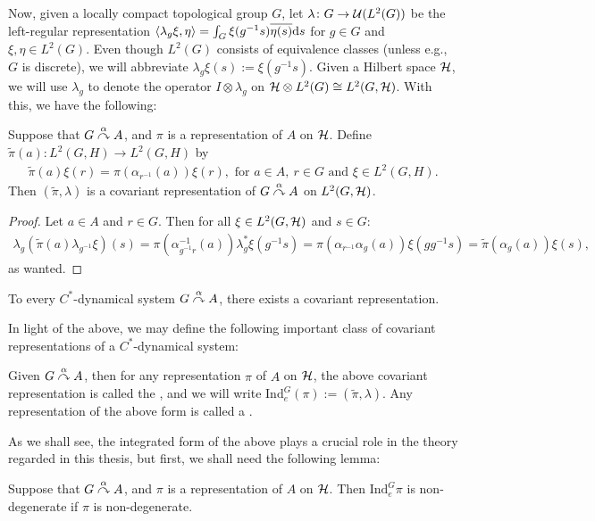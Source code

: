Now, given a locally compact topological group $G$, let $\lambda \colon G \to \mathcal{U}(L^2(G))$ be the left-regular representation $\langle \lambda_g \xi, \eta\rangle = \int_G \xi(g^{-1}s)\overline{\eta(s)}\mathrm{d} s$ for $g \in G$ and $\xi, \eta \in L^2(G)$. Even though $L^2(G)$ consists of equivalence classes (unless e.g., $G$ is discrete), we will abbreviate $\lambda_g \xi(s) := \xi(g^{-1}s)$. Given a Hilbert space $\mathcal{H}$, we will use $\lambda_g$ to denote the operator $I \otimes \lambda_g$ on $\mathcal{H} \otimes L^2(G) \cong L^2(G,\mathcal{H})$. With this, we have the following:
\begin{lemma}
	Suppose that $G \stackrel{\alpha}{\curvearrowright} A$, and $\pi$ is a representation of $A$ on $\mathcal{H}$. Define $\tilde{\pi}(a) \colon L^2(G,H) \to L^2(G,H)$ by 
	\begin{align*}
		\tilde{\pi}(a)\xi(r) = \pi(\alpha_{r^{-1}}(a))\xi(r), \text{ for } a \in A, \ r \in G \text{ and } \xi \in L^2(G,H).
	\end{align*}
	Then $(\tilde{\pi},\lambda)$ is a covariant representation of $G \stackrel{\alpha}{\curvearrowright} A$ on $L^2(G,\mathcal{H})$.
	\label{cross:regularrep}
\end{lemma}
\begin{proof}
	Let $a \in A$ and $r \in G$. Then for all $\xi \in L^2(G,\mathcal{H})$ and $s \in G$:
	\begin{align*}
		\lambda_g (\tilde{\pi}(a) \lambda_{g^{-1}} \xi)(s) = \pi(\alpha_{g^{-1}r}^{-1}(a))\lambda_g^* \xi(g^{-1}s) = \pi(\alpha_{r^{-1}}\alpha_g(a))\xi (g g^{-1} s) = \tilde{\pi}(\alpha_g(a))\xi(s),
	\end{align*}
	as wanted.
\end{proof}
\begin{corollary}
To every $C^*$-dynamical system $G \stackrel{\alpha}{\curvearrowright} A$, there exists a covariant representation.
\end{corollary}
In light of the above, we may define the following important class of covariant representations of a $C^*$-dynamical system:
\begin{definition}
	Given $G \stackrel{\alpha}{\curvearrowright} A$, then for any representation $\pi$ of $A$ on $\mathcal{H}$, the above covariant representation is called the , and we will write $\mathrm{Ind}_e^G(\pi) := (\tilde{\pi}, \lambda)$. Any representation of the above form is called a .
\end{definition}
As we shall see, the integrated form of the above plays a crucial role in the theory regarded in this thesis, but first, we shall need the following lemma:
\begin{lemma}
	Suppose that $G \stackrel{\alpha}{\curvearrowright} A$, and $\pi$ is a representation of $A$ on $\mathcal{H}$. Then $\mathrm{Ind}_e^G \pi$ is non-degenerate if $\pi$ is non-degenerate.
	\label{cross:regrepnondeg}
\end{lemma}
